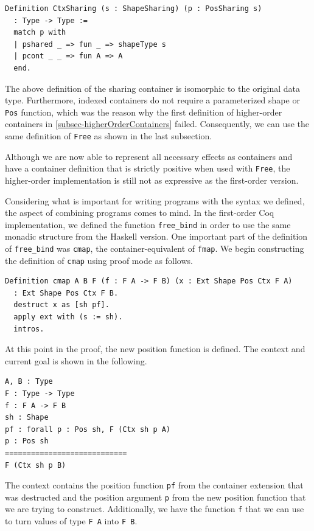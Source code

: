 \documentclass[a4paper, 11pt, fleqn, twoside, abstract=on]{scrreprt}
\newcommand{\cinl}[1]{\texttt{#1}}
\begin{document}
\begin{verbatim}
Definition CtxSharing (s : ShapeSharing) (p : PosSharing s) 
  : Type -> Type :=
  match p with
  | pshared _ => fun _ => shapeType s
  | pcont _ _ => fun A => A
  end.
\end{verbatim}

The above definition of the sharing container is isomorphic to the original data type.
Furthermore, indexed containers do not require a parameterized shape or \cinl{Pos} function, which was the reason why the first definition of higher-order containers in \autoref{subsec-higherOrderContainers} failed.
Consequently, we can use the same definition of \cinl{Free} as shown in the last subsection.

Although we are now able to represent all necessary effects as containers and have a container definition that is strictly positive when used with \cinl{Free}, the higher-order implementation is still not as expressive as the first-order version.

Considering what is important for writing programs with the syntax we defined, the aspect of combining programs comes to mind.
In the first-order Coq implementation, we defined the function \cinl{free_bind} in order to use the same monadic structure from the Haskell version.
One important part of the definition of \cinl{free_bind} was \cinl{cmap}, the container-equivalent of \cinl{fmap}.
We begin constructing the definition of \cinl{cmap} using proof mode as follows.

\begin{verbatim}
Definition cmap A B F (f : F A -> F B) (x : Ext Shape Pos Ctx F A) 
  : Ext Shape Pos Ctx F B.
  destruct x as [sh pf].
  apply ext with (s := sh).
  intros.
\end{verbatim}
\noindent
At this point in the proof, the new position function is defined.
The context and current goal is shown in the following.

\begin{verbatim}
A, B : Type
F : Type -> Type
f : F A -> F B
sh : Shape
pf : forall p : Pos sh, F (Ctx sh p A)
p : Pos sh
============================
F (Ctx sh p B)
\end{verbatim}
\noindent
The context contains the position function \cinl{pf} from the container extension that was destructed and the position argument \cinl{p} from the new position function that we are trying to construct.
Additionally, we have the function \cinl{f} that we can use to turn values of type \cinl{F A} into \cinl{F B}.
\end{document}
